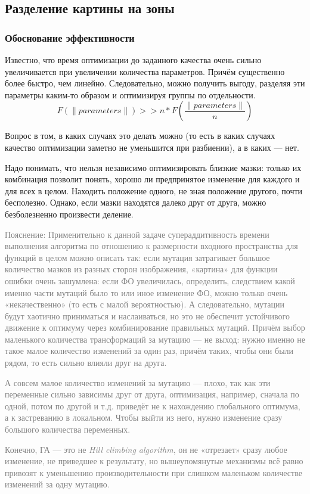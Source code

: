 \subsection{Разделение картины на зоны}\label{subsec:applying_zoning}

\subsubsection{Обоснование эффективности}\label{subsubsec:why_split_into_zones}
Известно, что время оптимизации до заданного качества очень сильно увеличивается при увеличении количества параметров.
Причём существенно более быстро, чем линейно.
Следовательно, можно получить выгоду, разделяя эти параметры каким-то образом и оптимизируя группы по отдельности.
\begin{equation}
    F(\lVert parameters \lVert) >> n * F(\frac{\lVert parameters \lVert}{n})
\end{equation}

Вопрос в том, в каких случаях это делать можно (то есть в каких случаях качество оптимизации заметно не уменьшится при разбиении), а в каких — нет.

Надо понимать, что нельзя независимо оптимизировать близкие мазки: только их комбинация позволит понять,
хорошо ли предпринятое изменение для каждого и для всех в целом.
Находить положение одного, не зная положение другого, почти бесполезно.
Однако, если мазки находятся далеко друг от друга, можно безболезненно произвести деление.

\textcolor{gray}{Пояснение: Применительно к данной задаче супераддитивность времени выполнения алгоритма по отношению к размерности входного пространства для функций в целом
можно описать так: если мутация затрагивает большое количество мазков из разных сторон изображения, «картина» для функции ошибки очень зашумлена:
если ФО увеличилась, определить, следствием какой именно части мутаций было то или иное изменение ФО, можно только очень «некачественно» (то есть с малой вероятностью).
А следовательно, мутации будут хаотично приниматься и наслаиваться, но это не обеспечит устойчивого движение к оптимуму через комбинирование правильных мутаций.
Причём выбор маленького количества трансформаций за мутацию — не выход: нужно именно не такое малое количество изменений за один раз, причём таких, чтобы они были рядом,
то есть сильно влияли друг на друга.

А совсем малое количество изменений за мутацию — плохо, так как эти переменные сильно зависимы друг от друга, оптимизация, например, сначала по одной, потом по другой и т.д.
приведёт не к нахождению глобального оптимума, а к застреванию в локальном.
Чтобы выйти из него, нужно изменение сразу большого количества переменных.

Конечно, ГА — это не \textit{Hill climbing algorithm}, он не «отрезает» сразу любое изменение, не приведшее к результату,
но вышеупомянутые механизмы всё равно привозят к уменьшению производительности при слишком маленьком количестве изменений за одну мутацию.}

